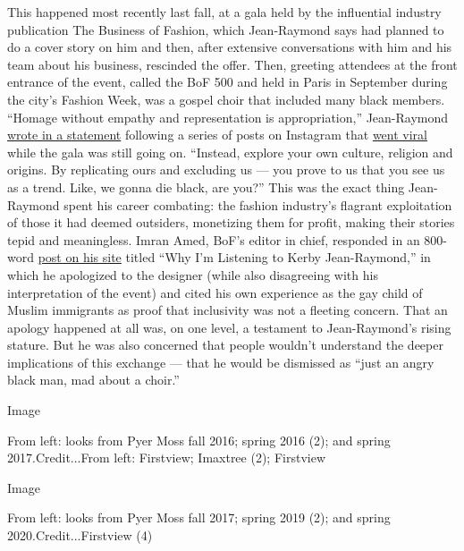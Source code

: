 This happened most recently last fall, at a gala held by the influential
industry publication The Business of Fashion, which Jean-Raymond says
had planned to do a cover story on him and then, after extensive
conversations with him and his team about his business, rescinded the
offer. Then, greeting attendees at the front entrance of the event,
called the BoF 500 and held in Paris in September during the city's
Fashion Week, was a gospel choir that included many black members.
``Homage without empathy and representation is appropriation,''
Jean-Raymond
\href{https://medium.com/@kerbyjeanraymond/peace-3d94209412fb}{wrote in
a statement} following a series of posts on Instagram that
\href{https://fashionista.com/2019/10/kerby-jean-raymond-bof-500-gala-controversy}{went
viral} while the gala was still going on. ``Instead, explore your own
culture, religion and origins. By replicating ours and excluding us ---
you prove to us that you see us as a trend. Like, we gonna die black,
are you?'' This was the exact thing Jean-Raymond spent his career
combating: the fashion industry's flagrant exploitation of those it had
deemed outsiders, monetizing them for profit, making their stories tepid
and meaningless. Imran Amed, BoF's editor in chief, responded in an
800-word
\href{https://www.businessoffashion.com/articles/editors-letter/why-im-listening-to-kerby-jean-raymond}{post
on his site} titled ``Why I'm Listening to Kerby Jean-Raymond,'' in
which he apologized to the designer (while also disagreeing with his
interpretation of the event) and cited his own experience as the gay
child of Muslim immigrants as proof that inclusivity was not a fleeting
concern. That an apology happened at all was, on one level, a testament
to Jean-Raymond's rising stature. But he was also concerned that people
wouldn't understand the deeper implications of this exchange --- that he
would be dismissed as ``just an angry black man, mad about a choir.''

Image

From left: looks from Pyer Moss fall 2016; spring 2016 (2); and spring
2017.Credit...From left: Firstview; Imaxtree (2); Firstview

Image

From left: looks from Pyer Moss fall 2017; spring 2019 (2); and spring
2020.Credit...Firstview (4)

